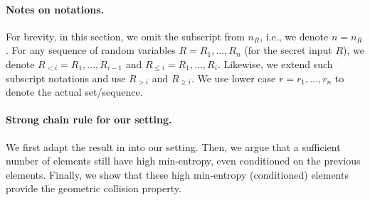 \paragraph{Notes on notations.} For brevity, in this section, we omit the subscript from $n_R$, i.e., we denote $n = n_R$. For any sequence of random variables $R = R_1, \dots, R_n$ (for the secret input $R$), we denote $R_{<i} = R_1,\dots,R_{i-1}$ and $R_{\leq i} = R_1,\dots,R_{i}$. Likewise, we extend such subscript notations and use $R_{>i}$ and $R_{\ge i}$. We use lower case $r = r_1,\dots,r_n$ to denote the actual set/sequence.


\paragraph{Strong chain rule for our setting.}
%
We first adapt the result in \cite{skorski2019strong} into our setting.  Then, we argue that a sufficient number of elements still have high min-entropy, even conditioned on the previous elements. Finally, we show that these high min-entropy (conditioned)  elements provide the geometric collision property.  

